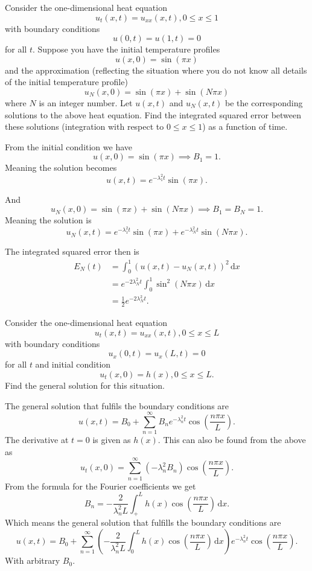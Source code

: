 
Consider the one-dimensional heat equation
\[ 
u_t(x,t) = u_{x x}(x,t), 0 \leq x \leq 1
\]
with boundary conditions
\[ 
u(0,t) = u(1,t) = 0
\]
for all $t$.
Suppose you have the initial temperature profiles
\[ 
u(x,0) = \sin(\pi x)
\]
and the approximation (reflecting the situation where you do not know all details of the initial temperature profile)
\[ 
u_N(x,0) = \sin (\pi x) + \sin (N \pi x)
\]
where $N$ is an integer number.
Let $u(x,t)$ and $u_N(x,t)$ be the corresponding solutions to the above heat equation.
Find the integrated squared error between these solutions (integration with respect to $0 \leq x \leq 1$) as a function of time.

\hr

From the initial condition we have
\[ 
u(x,0) = \sin ( \pi x) \implies B_1 = 1
.\]
Meaning the solution becomes
\[ 
u(x,t) = e^{- \lambda_1^2 t} \sin (\pi x)
.\]


And
\[ 
u_N(x,0) = \sin (\pi x) + \sin (N \pi x) \implies B_1 = B_N = 1
.\]
Meaning the solution is
\[ 
u_N(x,t) = e^{-\lambda_1^2 t} \sin (\pi x) + e^{- \lambda_N^2 t} \sin (N \pi x)
.\]

The integrated squared error then is
\begin{align*}
  E_N (t) &= \int_{0}^{1} \left( u (x,t) - u_N (x,t) \right)^2 \, \mathrm{d}x  \\
  &= e^{-2 \lambda_N^2 t} \int_{0}^{1} \sin^2 (N \pi x) \, \mathrm{d}x  \\
  &= \frac{1}{2} e^{- 2\lambda^2_N t}
.\end{align*}


Consider the one-dimensional heat equation
\[ 
u_t (x,t) = u_{x x}(x,t), 0 \leq x \leq L
\]
with boundary conditions
\[ 
u_x(0,t) = u_x(L, t) = 0
\]
for all $t$ and initial condition
\[ 
u_t(x, 0) = h(x), 0 \leq x \leq L
.\]
Find the general solution for this situation.

\hr

The general solution that fulfils the boundary conditions are
\[ 
u(x,t) = B_0 + \sum_{n = 1}^{\infty} B_n e^{- \lambda_n^2 t} \cos \left( \frac{n \pi x}{L} \right)
.\]
The derivative at $t = 0$ is given as $h(x)$. This can also be found from the above as
\[ 
u_t(x,0) = \sum_{n = 1}^{\infty} \left( - \lambda^2_n B_n \right) \cos \left( \frac{n \pi x}{L} \right)
.\]
From the formula for the Fourier coefficients we get
\[ 
B_n = - \frac{2}{\lambda_n^2 L} \int_{+}^{L} h(x) \cos \left( \frac{n \pi x}{L} \right) \, \mathrm{d}x
.\]
Which means the general solution that fulfills the boundary conditions are
\[ 
u(x,t) = B_0 + \sum_{n = 1}^{\infty} \left( - \frac{2}{\lambda_n^2 L} \int_{0}^{L} h(x) \cos \left( \frac{n \pi x}{L} \right) \, \mathrm{d}x  \right) e^{- \lambda_n^2 t} \cos \left( \frac{n \pi x}{L} \right)
.\]
With arbitrary $B_0$.


